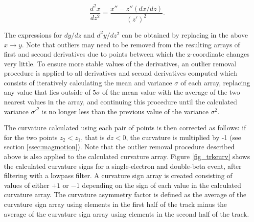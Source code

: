 \documentclass{JINST}
\begin{document}
\begin{equation}
\frac{d^2x}{dz^2} = \frac{x'' - z''(dx/dz)}{(z')^2}.
\end{equation}

The expressions for $dy/dz$ and $d^2y/dz^2$ can be obtained by replacing in the above $x \rightarrow y$.  Note that outliers may need to be removed from the resulting arrays of first and second derivatives due to points between which the z-coordinate changes very little.  To ensure more stable values of the derivatives, an outlier removal procedure is applied to all derivatives and second derivatives computed which consists of iteratively calculating the mean and variance $\sigma$ of each array, replacing any value that lies outside of $5\sigma$ of the mean value with the average of the two nearest values in the array, and continuing this procedure until the calculated variance $\sigma'^2$ is no longer less than the previous value of the variance $\sigma^2$. %

The curvature calculated using each pair of points is then corrected as follows: if for the two points $z_2 < z_1$, that is 
$dz < 0$, the curvature is multiplied by -1 (see section \ref{ssec:magmotion}).  Note that the outlier removal procedure 
described above is also applied to the calculated curvature array.  Figure \ref{fig_trkcurv} shows the calculated curvature 
signs for a single-electron and double-beta event, after filtering with a lowpass filter.  A curvature sign array is created 
consisting of values of either $+1$ or $-1$ depending on the sign of each value in the calculated curvature array.  The 
curvature asymmetry factor is defined as the average of the curvature sign array using elements in the first half of the 
track minus the average of the curvature sign array using elements in the second half of the track.
\end{document}

